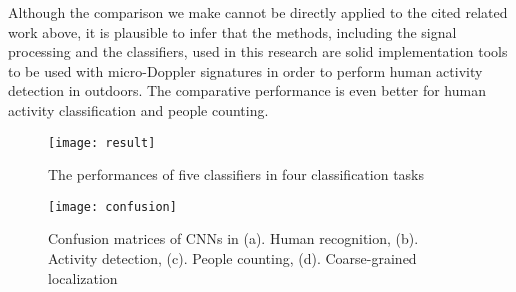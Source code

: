 Although the comparison we make cannot be directly applied to the cited related work above, it is plausible to infer that the methods, including the signal processing and the classifiers, used in this research are solid implementation tools to be used with micro-Doppler signatures in order to perform human activity detection in outdoors. The comparative performance is even better for human activity classification and people counting.
\begin{figure}[!t]
\centering
\texttt{[image: result]}
\caption{The performances of five classifiers in four classification tasks}
\label{fig_rsu}
\end{figure}

\begin{figure}[!t]
\centering
\texttt{[image: confusion]}
\caption{Confusion matrices of CNNs in (a). Human recognition, (b). Activity detection, (c). People counting, (d). Coarse-grained localization}
\label{fig_confusion}
\end{figure}

